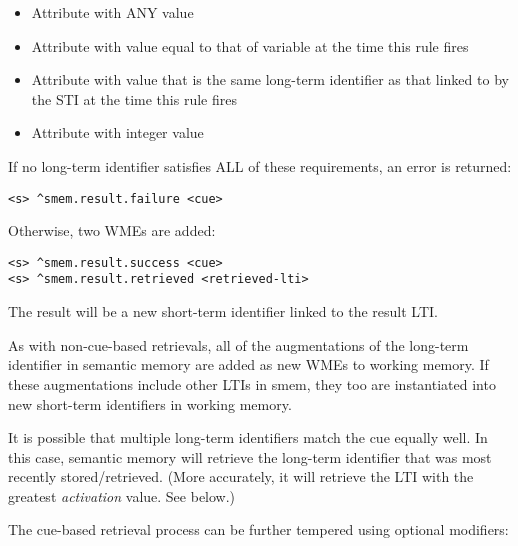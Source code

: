 \vspace{-12pt}
\begin{itemize}
	\item 
		Attribute  with ANY value
		\vspace{-6pt}
	\item 
		Attribute  with value equal to that of variable  at the time this rule fires
		\vspace{-6pt}
	\item 
		Attribute  with value that is the same long-term identifier as that linked to by the  STI at the time this rule fires
		\vspace{-6pt}
	\item 
		Attribute  with integer value 
		\vspace{-6pt}
\end{itemize}

If no long-term identifier satisfies ALL of these requirements, an error is returned:

\begin{verbatim}
<s> ^smem.result.failure <cue>
\end{verbatim}

Otherwise, two WMEs are added:

\begin{verbatim}
<s> ^smem.result.success <cue>
<s> ^smem.result.retrieved <retrieved-lti>
\end{verbatim}

The result  will be a new short-term identifier linked to the result LTI. 

As with non-cue-based retrievals, all of the augmentations of the long-term identifier in semantic memory are added as new WMEs to working memory. If these augmentations include other LTIs in smem, they too are instantiated into new short-term identifiers in working memory.

It is possible that multiple long-term identifiers match the cue equally well. 
In this case, semantic memory will retrieve the long-term identifier that was most recently stored/retrieved.
(More accurately, it will retrieve the LTI with the greatest \emph{activation} value. See below.)

The cue-based retrieval process can be further tempered using optional modifiers:

